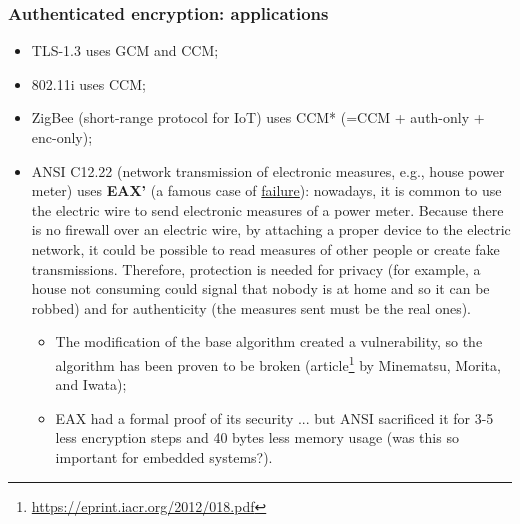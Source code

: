 \subsubsection{Authenticated encryption: applications}
\begin{itemize}
	\item TLS-1.3 uses GCM and CCM;
	\item 802.11i uses CCM;
	\item ZigBee (short-range protocol for IoT) uses CCM* (=CCM + auth-only + enc-only);
	\item ANSI C12.22 (network transmission of electronic measures, e.g., house power meter) uses \textbf{EAX'} (a famous case of \underline{failure}): nowadays, it is common to use the electric wire to send electronic measures of a power meter. Because there is no firewall over an electric wire, by attaching a proper device to the electric network, it could be possible to read measures of other people or create fake transmissions. Therefore, protection is needed for privacy (for example, a house not consuming could signal that nobody is at home and so it can be robbed) and for authenticity (the measures sent must be the real ones).
	      \begin{itemize}
		      \item The modification of the base algorithm created a vulnerability, so the algorithm has been proven to be broken (article\footnote{\url{https://eprint.iacr.org/2012/018.pdf}} by Minematsu, Morita, and Iwata);
		      \item EAX had a formal proof of its security ... but ANSI sacrificed it for 3-5 less encryption steps and 40 bytes less memory usage (was this so important for embedded systems?).
	      \end{itemize}
\end{itemize}


